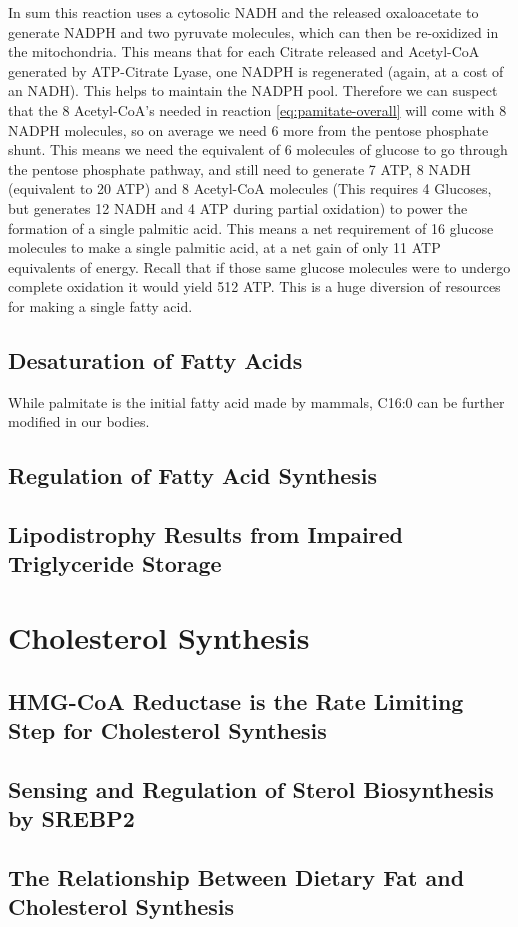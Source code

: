 \documentclass{tufte-handout}
\begin{document}
In sum this reaction uses a cytosolic NADH and the released oxaloacetate to generate NADPH and two pyruvate molecules, which can then be re-oxidized in the mitochondria.  This means that for each Citrate released and Acetyl-CoA generated by ATP-Citrate Lyase, one NADPH is regenerated (again, at a cost of an NADH).  This helps to maintain the NADPH pool.  Therefore we can suspect that the 8 Acetyl-CoA's needed in reaction \ref{eq:pamitate-overall} will come with 8 NADPH molecules, so on average we need 6 more from the pentose phosphate shunt.  This means we need the equivalent of 6 molecules of glucose to go through the pentose phosphate pathway, and still need to generate 7 ATP, 8 NADH (equivalent to 20 ATP) and 8 Acetyl-CoA molecules (This requires  4 Glucoses, but generates 12 NADH and 4 ATP during partial oxidation) to power the formation of a single palmitic acid.  This means a net requirement of 16 glucose molecules to make a single palmitic acid, at a net gain of only 11 ATP equivalents of energy.  Recall that if those same glucose molecules were to undergo complete oxidation it would yield 512 ATP.  This is a huge diversion of resources for making a single fatty acid.

\subsection{Desaturation of Fatty Acids}

While palmitate is the initial fatty acid made by mammals, C16:0 can be further modified in our bodies.

\subsection{Regulation of Fatty Acid Synthesis}

\subsection{Lipodistrophy Results from Impaired Triglyceride Storage}

\section{Cholesterol Synthesis}

\subsection{HMG-CoA Reductase is the Rate Limiting Step for Cholesterol Synthesis}

\subsection{Sensing and Regulation of Sterol Biosynthesis by SREBP2}

\subsection{The Relationship Between Dietary Fat and Cholesterol Synthesis}



\end{document}
